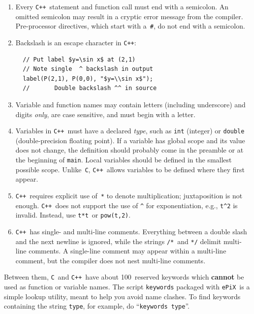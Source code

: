 \documentclass[12pt]{report}
\newcommand{\code}[1]{\texttt{#1}}
\newcommand{\ePiX}{\code{ePiX}}
\newcommand{\C}{\code{C}}
\newcommand{\CXX}{\code{C++}}
\begin{document}
\begin{enumerate}
\item Every \CXX\ statement and function call must end with a
  semicolon. An omitted semicolon may result in a cryptic error
  message from the compiler. Pre-processor directives, which start
  with a~\code{\#}, do not end with a semicolon.

\item Backslash is an escape character in \CXX:
\begin{verbatim}
  // Put label $y=\sin x$ at (2,1)
  // Note single  ^ backslash in output
  label(P(2,1), P(0,0), "$y=\\sin x$"); 
  //       Double backslash ^^ in source
\end{verbatim}
  
\item Variable and function names may contain letters (including
  underscore) and digits \emph{only}, are case sensitive, and must
  begin with a letter.

\item Variables in \CXX\ must have a declared \emph{type}, such as
  \code{int} (integer) or \code{double} (double-precision floating
  point). If a variable has global scope and its value does not
  change, the definition should probably come in the preamble or at
  the beginning of \code{main}. Local variables should be defined in
  the smallest possible scope. Unlike~\C, \CXX\ allows variables to be
  defined where they first appear.
  
\item \CXX~requires explicit use of~\code{*} to denote multiplication;
  juxtaposition is not enough. \CXX~does not support the use of
  \verb+^+ for exponentiation, e.g., \verb+t^2+ is invalid. Instead,
  use \code{t*t}~or \code{pow(t,2)}.

\item \CXX\ has single- and multi-line comments. Everything between a
  double slash and the next newline is ignored, while the strings
  \verb+/*+~and \verb+*/+ delimit multi-line comments. A single-line
  comment may appear within a multi-line comment, but the compiler
  does not nest multi-line comments.

\end{enumerate}

Between them, \C~and \CXX~have about 100~reserved keywords which
\textbf{cannot} be used as function or variable names. The script
\code{keywords} packaged with \ePiX\ is a simple lookup utility, meant
to help you avoid name clashes. To find keywords containing the string
\code{type}, for example, do ``\code{keywords type}''.
  
\end{document}
